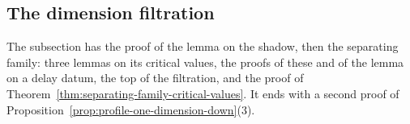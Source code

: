 

\subsection{The dimension filtration}\label{supp:proofs-filtration}

The subsection has the proof of the lemma on the shadow, then the separating family: three
lemmas on its critical values, the proofs of these and of the lemma on a delay datum, the
top of the filtration, and the proof of Theorem~\ref{thm:separating-family-critical-values}. It
ends with a second proof of Proposition~\ref{prop:profile-one-dimension-down}(3).

